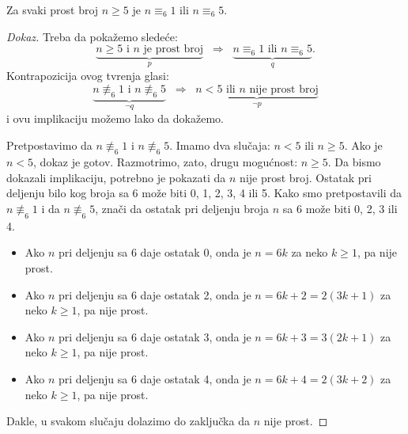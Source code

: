 \begin{EX}
  Za svaki prost broj $n \ge 5$ je $n \equiv_6 1$ ili $n \equiv_6 5$.
\end{EX}
\begin{proof}[Dokaz]
  Treba da poka\v zemo slede\'ce:
  $$
    \underbrace{n \ge 5 \text{ i } n \text{ je prost broj}}_p
    \;\;\Rightarrow\;\;
    \underbrace{n \equiv_6 1 \text{ ili } n \equiv_6 5}_q.
  $$
  Kontrapozicija ovog tvr\dj enja glasi:
  $$
    \underbrace{n \not\equiv_6 1 \text{ i } n \not\equiv_6 5}_{\lnot q}
    \;\;\Rightarrow\;\;
    \underbrace{n < 5 \text{ ili } n \text{ nije prost broj}}_{\lnot p}
  $$
  i ovu implikaciju mo\v zemo lako da doka\v zemo.
  
  Pretpostavimo da $n \not\equiv_6 1$ i $n \not\equiv_6 5$. Imamo dva slu\v caja:
  $n < 5$ ili $n \ge 5$. Ako je $n < 5$, dokaz je gotov. Razmotrimo, zato, drugu mogu\'cnost: $n \ge 5$.
  Da bismo dokazali implikaciju, potrebno je pokazati da $n$ nije prost broj.
  Ostatak pri deljenju bilo kog broja sa $6$ mo\v ze biti 0, 1, 2, 3, 4 ili 5. Kako smo pretpostavili da
  $n \not\equiv_6 1$ i da $n \not\equiv_6 5$, zna\v ci da ostatak pri deljenju broja $n$ sa 6 mo\v ze biti
  0, 2, 3 ili 4.
  \begin{itemize}
  \item Ako $n$ pri deljenju sa 6 daje ostatak 0, onda je $n = 6k$ za neko $k \ge 1$, pa nije prost.
  \item Ako $n$ pri deljenju sa 6 daje ostatak 2, onda je $n = 6k + 2 = 2(3k + 1)$ za neko $k \ge 1$, pa nije prost.
  \item Ako $n$ pri deljenju sa 6 daje ostatak 3, onda je $n = 6k + 3 = 3(2k + 1)$ za neko $k \ge 1$, pa nije prost.
  \item Ako $n$ pri deljenju sa 6 daje ostatak 4, onda je $n = 6k + 4 = 2(3k + 2)$ za neko $k \ge 1$, pa nije prost.
  \end{itemize}
  Dakle, u svakom slu\v caju dolazimo do zaklju\v cka da $n$ nije prost.
\end{proof}

